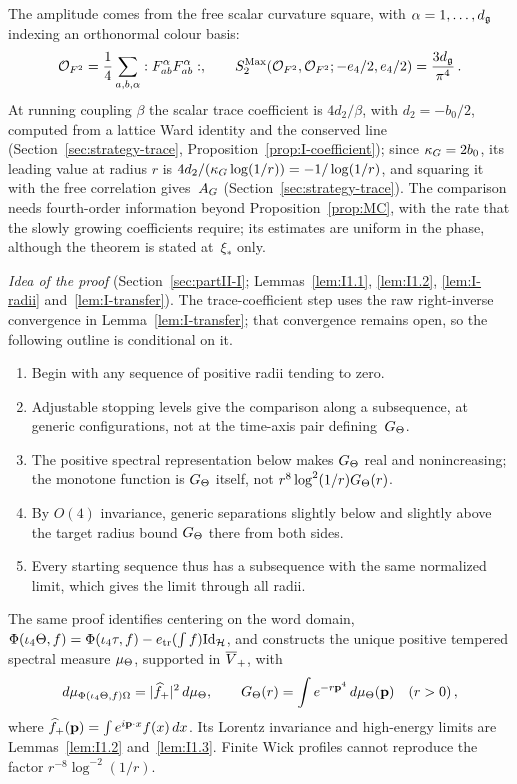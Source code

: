 The amplitude comes from the free scalar curvature square, with $\alpha=1,\ldots,d_{\mathfrak{g}}$ indexing an orthonormal colour basis:
\begin{equation*}
\mathcal{O}_{F^2}=\frac14\sum_{a,b,\alpha}:F_{ab}^{\alpha}F_{ab}^{\alpha}:,\qquad
S^{\mathrm{Max}}_2(\mathcal{O}_{F^2},\mathcal{O}_{F^2};-e_4/2,e_4/2)=\frac{3d_{\mathfrak{g}}}{\pi^4}\,.
\end{equation*}
At running coupling $\beta$ the scalar trace coefficient is $4d_2/\beta$, with $d_2=-b_0/2$, computed from a lattice Ward identity and the conserved line (Section~\ref{sec:strategy-trace}, Proposition~\ref{prop:I-coefficient}); since $\kappa_G=2b_0$, its leading value at radius $r$ is $4d_2/(\kappa_G\log(1/r))=-1/\log(1/r)$, and squaring it with the free correlation gives~$A_G$ (Section~\ref{sec:strategy-trace}). The comparison needs fourth-order information beyond Proposition~\ref{prop:MC}, with the rate that the slowly growing coefficients require; its estimates are uniform in the phase, although the theorem is stated at~$\xi_*$ only.

\emph{Idea of the proof} (Section~\ref{sec:partII-I}; Lemmas~\ref{lem:I1.1}, \ref{lem:I1.2}, \ref{lem:I-radii} and~\ref{lem:I-transfer}). The trace-coefficient step uses the raw right-inverse convergence in Lemma~\ref{lem:I-transfer}; that convergence remains open, so the following outline is conditional on it.
\begin{enumerate}[label=\textup{Step \arabic*.},leftmargin=4.2em,nosep]
\item Begin with any sequence of positive radii tending to zero.
\item Adjustable stopping levels give the comparison along a subsequence, at generic configurations, not at the time-axis pair defining~$G_{\Theta}$.
\item The positive spectral representation below makes $G_{\Theta}$ real and nonincreasing; the monotone function is $G_{\Theta}$ itself, not $r^8\log^2(1/r)G_{\Theta}(r)$.
\item By $O(4)$ invariance, generic separations slightly below and slightly above the target radius bound $G_{\Theta}$ there from both sides.
\item Every starting sequence thus has a subsequence with the same normalized limit, which gives the limit through all radii.
\end{enumerate}
The same proof identifies centering on the word domain, $\Phi(\iota_4\Theta,f)=\Phi(\iota_4\tau,f)-e_{\rm tr}(\int f)\mathrm{Id}_{\mathcal H}$, and constructs the unique positive tempered spectral measure $\mu_{\Theta}$, supported in $\overline{V}_+$, with
\begin{equation*}
d\mu_{\Phi(\iota_4\Theta,f)\Omega}=|\widehat{f}_{+}|^2\,d\mu_{\Theta},\qquad G_{\Theta}(r)=\int e^{-r\mathbf p^4}\,d\mu_{\Theta}(\mathbf p)\quad(r>0)\,,
\end{equation*}
where $\widehat{f}_{+}(\mathbf p)=\int e^{i\mathbf p\cdot x}f(x)\,dx$. Its Lorentz invariance and high-energy limits are Lemmas~\ref{lem:I1.2} and~\ref{lem:I1.3}. Finite Wick profiles cannot reproduce the factor $r^{-8}\log^{-2}(1/r)$.

